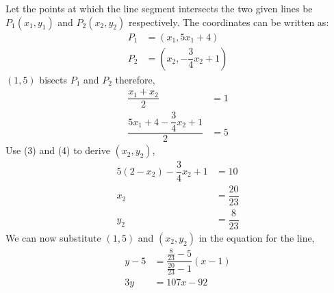\begin{solution}
  Let the points at which the line segment intersects the two given lines
  be $P_1(x_1, y_1)$ and $P_2(x_2, y_2)$ respectively. The coordinates can be
  written as:
  \begin{align}
    P_1 &= (x_1, 5x_1+4) \\
    P_2 &= (x_2, -\dfrac{3}{4}x_2+1)    
  \end{align}
  $(1,5)$ bisects $P_1$ and $P_2$ therefore,
  \begin{align}
    \dfrac{x_1+x_2}{2}                     &= 1 \\
    \dfrac{5x_1+4-\dfrac{3}{4}x_2+1}{2}    &= 5  
  \end{align}
  Use (3) and (4) to derive $(x_2, y_2)$,
  \begin{align}
    5(2-x_2)-\dfrac{3}{4}x_2+1 &= 10 \nonumber \\
                           x_2 &= \dfrac{20}{23} \nonumber \\
                           y_2 &= \dfrac{8}{23} \nonumber
  \end{align}
  We can now substitute $(1,5)$ and $(x_2, y_2)$ in the equation for 
  the line, 
  \begin{align}
    y-5 &= \dfrac{\frac{8}{23}-5}{\frac{20}{23}-1}(x-1) \nonumber \\
    3y  &= 107x - 92									\nonumber    
  \end{align}
\end{solution}
